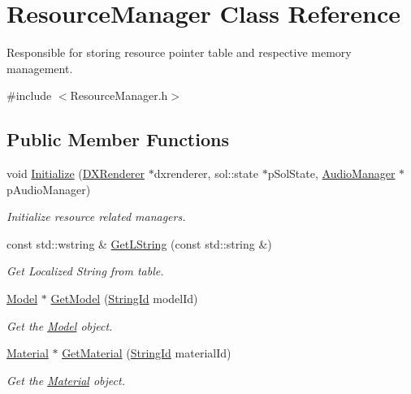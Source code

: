 \hypertarget{classResourceManager}{}\section{Resource\+Manager Class Reference}
\label{classResourceManager}


Responsible for storing resource pointer table and respective memory management.  




{\ttfamily \#include $<$Resource\+Manager.\+h$>$}

\subsection*{Public Member Functions}
\begin{DoxyCompactItemize}
\item 
void \hyperlink{classResourceManager_ac27135ce81288b0d4c470e24ec491b69}{Initialize} (\hyperlink{classDXRenderer}{D\+X\+Renderer} $\ast$dxrenderer, sol\+::state $\ast$p\+Sol\+State, \hyperlink{classAudioManager}{Audio\+Manager} $\ast$p\+Audio\+Manager)
\begin{DoxyCompactList}\small\item\em Initialize resource related managers. \end{DoxyCompactList}\item 
const std\+::wstring \& \hyperlink{classResourceManager_a168973482436d284632a2bfe1a57e692}{Get\+L\+String} (const std\+::string \&)
\begin{DoxyCompactList}\small\item\em Get Localized String from table. \end{DoxyCompactList}\item 
\hyperlink{classModel}{Model} $\ast$ \hyperlink{classResourceManager_a5355a5eb681e10b80dff36113ad9749a}{Get\+Model} (\hyperlink{classStringId}{String\+Id} model\+Id)
\begin{DoxyCompactList}\small\item\em Get the \hyperlink{classModel}{Model} object. \end{DoxyCompactList}\item 
\hyperlink{classMaterial}{Material} $\ast$ \hyperlink{classResourceManager_a73212ea2111770644e50b5531da15292}{Get\+Material} (\hyperlink{classStringId}{String\+Id} material\+Id)
\begin{DoxyCompactList}\small\item\em Get the \hyperlink{classMaterial}{Material} object. \end{DoxyCompactList}\item 

\end{DoxyCompactItemize}
